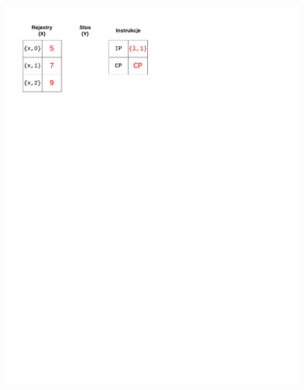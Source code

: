 \begin{figure}
\begin{multicols}{2}

\vspace{-4mm}
\begin{Figure}
 \centering
 \includegraphics[scale=0.65, clip, trim=0 215mm 110mm 0]{interpreter_max_1}
\label{fig:max1}
\end{Figure}


\end{multicols}
\end{figure}
